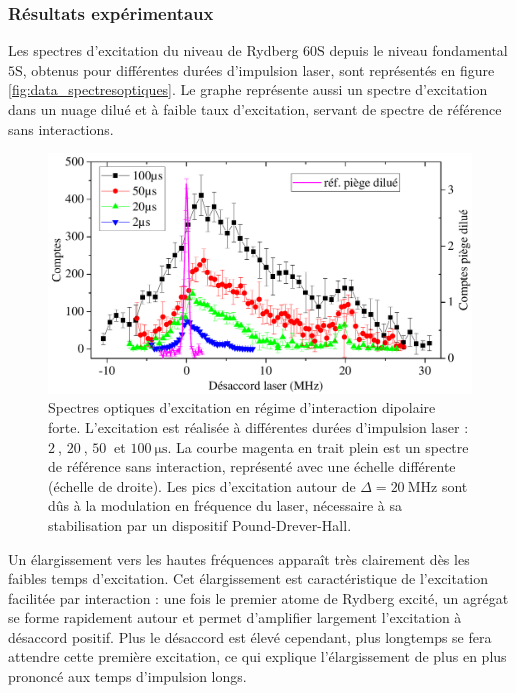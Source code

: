 		\subsubsection*{Résultats expérimentaux}
\noindent Les spectres d'excitation du niveau de Rydberg $\mathrm{60S}$ depuis le niveau fondamental $\mathrm{5S}$, obtenus pour différentes durées d'impulsion laser, sont représentés en figure \eqref{fig:data_spectresoptiques}.
Le graphe représente aussi un spectre d'excitation dans un nuage dilué et à faible taux d'excitation, servant de spectre de référence sans interactions.
%
\begin{figure}[!h]
\centering
\includegraphics[width=\linewidth]{figures/low_l/data_spectres_optiques}
\caption[Spectres optiques d'excitation en régime d'interaction dipolaire forte]{Spectres optiques d'excitation en régime d'interaction dipolaire forte.
L'excitation est réalisée à différentes durées d'impulsion laser : $\SI{2}{}$, $\SI{20}{}$, $\SI{50}{}$ et $\SI{100}{\us}$.
La courbe magenta en trait plein est un spectre de référence sans interaction, représenté avec une échelle différente (échelle de droite).
Les pics d'excitation autour de $\Delta = \SI{20}{\MHz}$ sont dûs à la modulation en fréquence du laser, nécessaire à sa stabilisation par un dispositif Pound-Drever-Hall.
}
\label{fig:data_spectresoptiques}
\end{figure}
%
Un élargissement vers les hautes fréquences apparaît très clairement dès les faibles temps d'excitation.
Cet élargissement est caractéristique de l'excitation facilitée par interaction :
une fois le premier atome de Rydberg excité, un agrégat se forme rapidement autour et permet d'amplifier largement l'excitation à désaccord positif.
Plus le désaccord est élevé cependant, plus longtemps se fera attendre cette première excitation, ce qui explique l'élargissement de plus en plus prononcé aux temps d'impulsion longs.

